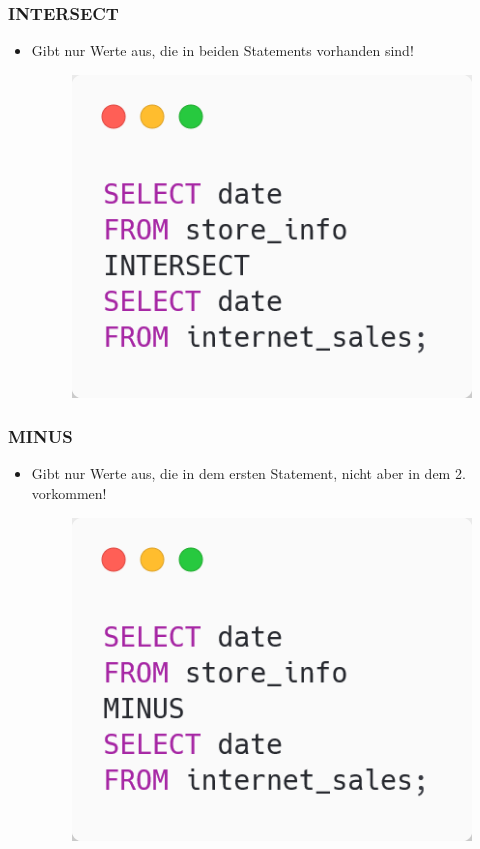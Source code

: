 \subsubsection{INTERSECT}
\begin{itemize}
    \item Gibt nur Werte aus, die in beiden Statements vorhanden sind!
    \begin{figure}[H]
        \centering
        \includegraphics[scale=.4]{res/themenkorb_2/intersect.png} 
    \end{figure}
\end{itemize}

\subsubsection{MINUS}
\begin{itemize}
    \item Gibt nur Werte aus, die in dem ersten Statement, nicht aber in dem 2. vorkommen!
    \begin{figure}[H]
        \centering
        \includegraphics[scale=.4]{res/themenkorb_2/minus.png} 
    \end{figure}
\end{itemize}

